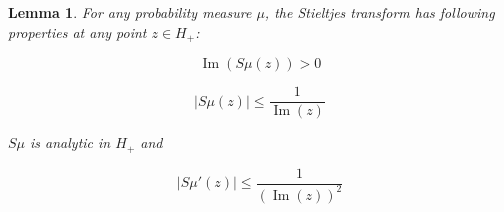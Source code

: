 \documentclass[12pt,a4paper,leqno]{report}
\renewcommand{\Im}{\operatorname{Im}}
\theoremstyle{plain}
\newtheorem{lem}[equation]{Lemma}
\theoremstyle{definition}
\theoremstyle{remark}
\begin{document}
\begin{lem}
For any probability measure $\mu$, the Stieltjes transform has following properties at any point $z \in H_+$:

\begin{equation}\label{prop1}
\Im(S\mu(z)) > 0
\end{equation}

\begin{equation}\label{prop2}
|S\mu(z)|\leq \frac{1}{\Im(z)} 
\end{equation}

$S\mu$ is analytic in $H_+$ and

\begin{equation}\label{prop3}
|S\mu'(z)| \leq \frac{1}{(\Im(z))^2}
\end{equation}
\end{lem}
\end{document}

